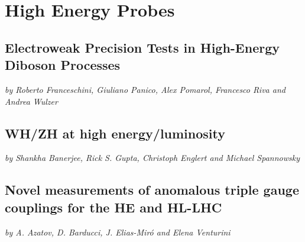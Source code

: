 \documentclass[../report.tex]{subfiles}
\providecommand{\main}{..}
\begin{document}
\section{High Energy Probes}







\subsection{Electroweak Precision Tests  in High-Energy Diboson Processes} \label{WZlong}
\begin{center}
{\it by Roberto Franceschini,  Giuliano Panico,  Alex Pomarol,
  Francesco Riva  and Andrea Wulzer}
\end{center}






\subsection{WH/ZH at high energy/luminosity}\label{sec:ZHWZeft}
\begin{center}
{\it by Shankha Banerjee,  Rick S. Gupta,  Christoph Englert and Michael Spannowsky}
\end{center}





\subsection{Novel measurements of anomalous triple gauge couplings for the HE and HL-LHC} \label{sec:WZtrans}
\begin{center}
{\it by A. Azatov, D. Barducci, J. Elias-Mir\'o and Elena Venturini}
\end{center}

\end{document}
